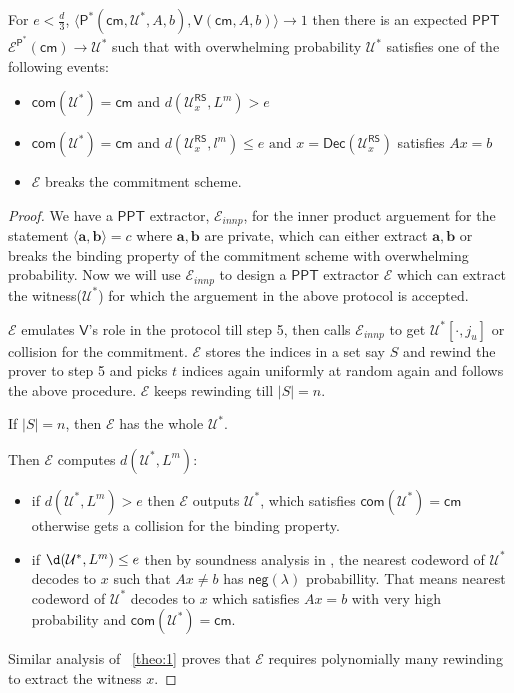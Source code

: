 \documentclass[runningheads]{llncs}
\newcommand{\innp}[2]{\langle #1,#2\rangle}
\def\ppt{\mathsf{PPT}}
\def\extrac{\mathcal{E}}
\def\prover{\mathsf{P}}
\def\verifier{\mathsf{V}}
\def\RS{\mathsf{RS}} %
\def\cm{\mathsf{cm}} %
\def\com{\mathsf{com}} %
\def\negl{\mathsf{neg}}
\def\oracle{\mathcal{U}^{\RS}}
\def\dec{\mathsf{Dec}}
\def\calU{\mathcal{U}}
\begin{document}
	\begin{theorem}
		For $e < \frac{d}{3} $, $\innp{\prover^*(\cm, \calU^*, A, b)}{\verifier(\cm, A, b)} \rightarrow 1 $ then there is an expected $\ppt$ $\extrac^{\prover^*}(\cm) \rightarrow \calU^*$ such that with overwhelming probability $\calU^*$ satisfies one of the following events:
		\begin{itemize}
			\item $\com(\calU^*)=\cm$ and $d(\oracle_x,L^m) > e $
			\item $\com(\calU^*)=\cm$ and $d(\oracle_x, l^m)\leq e \text{ and } x = \dec(\oracle_x)$ satisfies $ Ax = b$
			\item $\extrac$ breaks the commitment scheme.
		\end{itemize}
	\end{theorem}

	\begin{proof}
	We have a $\ppt$ extractor, $\extrac_{innp}$, for the inner product arguement for the statement $\innp{\bm{a}}{\bm{b}}=c$ where $\bm{a},\bm{b}$ are private, which can either extract $\bm{a}, \bm{b}$ or breaks the binding property of the commitment scheme with overwhelming probability. Now we will use $\extrac_{innp}$ to design a $\ppt$ extractor $\extrac$ which can extract the witness($\calU^*$) for which the arguement in the above protocol is accepted.
	
	 $\extrac$ emulates $\verifier$'s role in the protocol till step 5, then calls $\extrac_{innp}$ to get $\calU^*[\cdot,j_u]$ or collision for the commitment. $\extrac$ stores the indices in a set say $S$ and rewind the prover to step 5 and picks $t$ indices again uniformly at random again and follows the above procedure. $\extrac$ keeps rewinding till $|S|=n$.
	 
	 If $|S|=n$, then $\extrac$ has the whole $\calU^*$.
	 
	 Then $\extrac$ computes $d(\calU^*, L^m)$:
	 \begin{itemize}
	 	\item if $d(\calU^*,L^m) > e$ then $\extrac$ outputs $\calU^*$, which satisfies $\com(\calU^*)=\cm$ otherwise gets a collision for the binding property.
	 	
	 	\item if $\d(\calU^*,L^m) \leq e$ then by soundness analysis in \cite{Ligero2017}, the nearest codeword of $\calU^*$ decodes to $x$ such that $Ax\neq b$ has $\negl(\lambda)$ probabillity. That means nearest codeword of $\calU^*$ decodes to $x$ which satisfies $Ax=b$ with very high probability and $\com(\calU^*)=\cm$.
	 \end{itemize}
 
	 Similar analysis of ~\ref{theo:1} proves that $\extrac$ requires polynomially many rewinding to extract the witness $x$.
	\end{proof}
\end{document}
